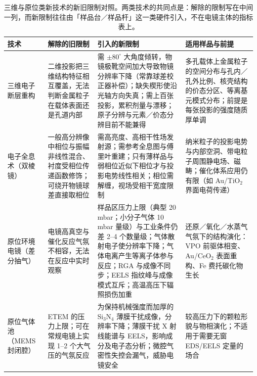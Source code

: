\begin{table}[htbp]
\centering
\setlength{\tabcolsep}{4pt}
\small
\caption{三维与原位类新技术的新旧限制对照。两类技术的共同点是：解除的限制写在中间一列，而新限制往往由「样品台／样品杆」这一类硬件引入，不在电镜主体的指标表上。}
\label{tab:ch02c-situ}
\begin{tabular}{@{}p{26mm}p{36mm}p{44mm}p{34mm}@{}}
\toprule
技术 & 解除的旧限制 & 引入的新限制 & 适用样品与前提 \\
\midrule
三维电子断层重构 & 二维投影把三维结构特征相互覆盖，无法判断金属粒子在载体表面还是孔道内部 & 需 $\pm 80^\circ$ 大角度倾转，物镜极靴空间加大导致物镜分辨率下降（常靠球差校正器补偿）；缺失楔形使沿光轴方向失真；需上百张投影，累积剂量与漂移；原子分辨与元素／价态分辨目前不能兼得 & 多孔载体上金属粒子的空间分布与孔内／孔外比例、核壳结构的价态分区、等离基元模式分布；前提是每张投影的强度随质厚单调 \\
\addlinespace
电子全息术（双棱镜） & 一般高分辨像中相位与振幅非线性混合、衬度受相位传递函数修饰；可绕开物镜球差直接取相位 & 需高亮度、高相干性场发射源；需参考全息图与傅里叶重建；只有薄样品与弱相位近似下相位才与投影电势线性相关；相位需解缠，视场受相干宽度限制 & 纳米粒子的投影电势与内部空洞、带电粒子周围静电场、磁畴；催化体系应用仍有限（如 Au/TiO$_2$ 界面电荷传递） \\
\addlinespace
原位环境电镜（差分抽气） & 电镜高真空与催化反应气氛不相容，无法在反应中实时观察 & 样品区压力上限（典型 20\,mbar；小分子气体 10\,mbar 量级）与工业条件仍差 2--4 个数量级；气体散射电子使分辨率下降；气体电离产生等离子体参与反应；RGA 与成像不同步；EELS 指纹峰与成像模式互斥；高温高压下辐照损伤加重 & 还原／氧化／水蒸气气氛下的结构演化：VPO 前驱体相变、Au/CeO$_2$ 表面重构、Fe 费托碳化物生长 \\
\addlinespace
原位气体池（MEMS 封闭腔） & ETEM 的压力上限；可在常规电镜上实现 1--2 个大气压的气氛反应 & 为保持机械强度而加厚的 Si$_3$N$_4$ 薄膜干扰成像，分辨率下降；薄膜干扰 X 射线能谱与 EELS，影响成分及电子态分析；微腔气密性失控会漏气，威胁电镜安全 & 较高压力下的颗粒形貌与物相演化；不适用于需要无窗 EDS/EELS 定量的场合 \\
\bottomrule
\end{tabular}
\end{table}


